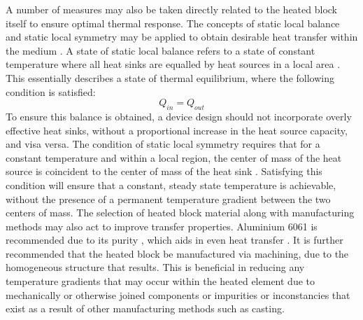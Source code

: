 A number of measures may also be taken directly related to the heated block itself to ensure optimal thermal response. The concepts of static local balance and static local symmetry may be applied to obtain desirable heat transfer within the medium \cite{7238517}. A state of static local balance refers to a state of constant temperature where all heat sinks are equalled by heat sources in a local area \cite{7238517}. This essentially describes a state of thermal equilibrium, where the following condition is satisfied:
\begin{equation}
Q_{in} = Q_{out}
\end{equation}
To ensure this balance is obtained, a device design should not incorporate overly effective heat sinks, without a proportional increase in the heat source capacity, and visa versa. The condition of static local symmetry requires that for a constant temperature and within a local region, the center of mass of the heat source is coincident to the center of mass of the heat sink \cite{7238517}. Satisfying this condition will ensure that a constant, steady state temperature is achievable, without the presence of a permanent temperature gradient between the two centers of mass. The selection of heated block material along with manufacturing methods may also act to improve transfer properties. Aluminium 6061 is recommended due to its purity \cite{7238517}, which aids in even heat transfer \cite{OLAFSSON1997}. It is further recommended that the heated block be manufactured via machining, due to the homogeneous structure that results. This is beneficial in reducing any temperature gradients that may occur within the heated element due to mechanically or otherwise joined components or impurities or inconstancies that exist as a result of other manufacturing methods such as casting.

